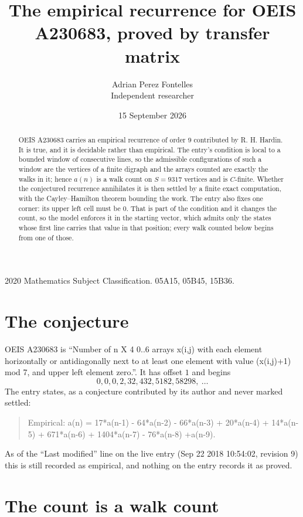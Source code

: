 \documentclass[11pt,a4paper]{article}
\title{The empirical recurrence for OEIS A230683, proved by transfer matrix}
\author{Adrian Perez Fontelles\\ \small Independent researcher}
\date{15 September 2026}
\theoremstyle{plain}
\theoremstyle{definition}
\begin{document}
\maketitle

\begin{abstract}
OEIS A230683 carries an empirical recurrence of order $9$ contributed by R. H. Hardin. It is
true, and it is decidable rather than empirical. The entry's condition is local to a bounded window of consecutive lines, so
the admissible configurations of such a window are the vertices of a finite digraph and the
arrays counted are exactly the walks in it; hence $a(n)$ is a walk count on $S=9317$ vertices
and is $C$-finite. Whether the conjectured recurrence annihilates it is then settled by a
finite exact computation, with the Cayley--Hamilton theorem bounding the work.
 The entry also fixes one corner: its upper left cell must be $0$. That is part of the condition and it changes the count, so the model enforces it in the starting vector, which admits only the states whose first line carries that value in that position; every walk counted below begins from one of those.\end{abstract}

\noindent\small 2020 Mathematics Subject Classification. 05A15, 05B45, 15B36.\normalsize

\section{The conjecture}

OEIS A230683 is ``Number of n X 4 0..6 arrays x(i,j) with each element horizontally or antidiagonally next to at least one element with value (x(i,j)+1) mod 7, and upper left element zero.''. It has offset $1$ and begins
\[
0, 0, 0, 2, 32, 432, 5182, 58298,\ \dots
\]
The entry states, as a conjecture contributed by its author and never marked settled:
\begin{quote}
Empirical: a(n) = 17*a(n-1) - 64*a(n-2) - 66*a(n-3) + 20*a(n-4) + 14*a(n-5) + 671*a(n-6) + 1404*a(n-7) - 76*a(n-8) +a(n-9).
\end{quote}
As of the ``Last modified'' line on the live entry (Sep 22 2018 10:54:02, revision 9) this is still
recorded as empirical, and nothing on the entry records it as proved.

\section{The count is a walk count}
\end{document}
